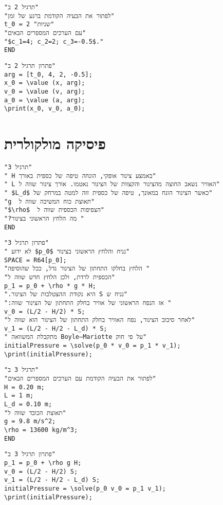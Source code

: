 \vspace*{-3mm}

\begin{verbatim}
"תרגיל 2 ב"
"לפתור את הבעיה הקודמת ברגע של זמן"
t_0 = 2 "שניות"
"עם הערכים המספרים הבאים"
"$c_1=4; c_2=2; c_3=-0.5$."
END
\end{verbatim}

\vspace*{-3mm}

\begin{verbatim}
"פתרון תרגיל 2 ב"
arg = [t_0, 4, 2, -0.5];
x_0 = \value (x, arg);  
v_0 = \value (v, arg);
a_0 = \value (a, arg);
\print(x_0, v_0, a_0);
\end{verbatim}

\vspace*{-3mm}

\section{פיסיקה מולקולרית} 

\begin{verbatim}
"תרגיל 3"
" H באמצע צינור אופקי, הונחה טיפה של כספית באורך" 
" L האוויר נשאב החוצה מהצינור והקצוות של הצינור נאטמו. אורך צינור שווה ל" 
" $L_d$ כאשר הצינור הונח במאונך, טיפה של כספית זזה למטה במרחק של"
"g  תאוצת כוח המשיכה שווה ל"
"$\rho$  הצפיפות הכספית שווה ל"
"?מה הלחץ הראשוני בצינור "
END
\end{verbatim}

\vspace*{-3mm}

\begin{verbatim}
"פתרון תרגיל 3"
" לא ידוע $p_0$ נניח והלחץ הראשוני בצינור"
SPACE = R64[p_0];
"הלחץ בחלקו התחתון של הצינור גדל, ככל שהוסיפה "
"הכספית לרדת, ולכן הלחץ חדש שווה ל"
p_1 = p_0 + \rho * g * H;
".היא נקודת ההצטלבות של הצינור S נניח ש"
":אז הנפח הראשוני של אוויר בחלק התחתון של הצינור שווה "
v_0 = (L/2 - H/2) * S;
"לאחר סיבוב הצינור, נפח האוויר בחלק התחתון של הצינור הוא שווה ל"
v_1 = (L/2 - H/2 - L_d) * S;
" מתקבלת המשוואה Boyle–Mariotte על פי חוק"
initialPressure = \solve(p_0 * v_0 = p_1 * v_1);
\print(initialPressure);
\end{verbatim}

\vspace*{-3mm}

\begin{verbatim}
"תרגיל 3 ב"
"לפתור את הבעיה הקודמת עם הערכים המספרים הבאים"
H = 0.20 m;
L = 1 m;
L_d = 0.10 m;
"תאוצת הכובד שווה ל"
g = 9.8 m/s^2;
\rho = 13600 kg/m^3;
END
\end{verbatim}

\vspace*{-3mm}

\begin{verbatim}
"פתרון תרגיל 3 ב"
p_1 = p_0 + \rho g H;
v_0 = (L/2 - H/2) S; 
v_1 = (L/2 - H/2 - L_d) S;
initialPressure = \solve(p_0 v_0 = p_1 v_1);
\print(initialPressure);
\end{verbatim}
